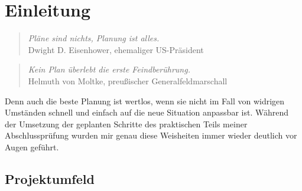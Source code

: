\section{Einleitung}
\label{sec:Einleitung}
\begin{center}
\begin{quote}
\textit{Pläne sind nichts, Planung ist alles.}\\
Dwight D. Eisenhower, ehemaliger US-Präsident
\end{quote}
\begin{quote}
\textit{Kein Plan überlebt die erste Feindberührung.}\\
Helmuth von Moltke, preußischer Generalfeldmarschall
\end{quote}
\end{center}
Denn auch die beste Planung ist wertlos, wenn sie nicht im Fall von widrigen Umständen schnell und einfach auf die neue Situation anpassbar ist. Während der Umsetzung der geplanten Schritte des praktischen Teils meiner Abschlussprüfung wurden mir genau diese Weisheiten immer wieder deutlich vor Augen geführt.

\subsection{Projektumfeld} 
\label{sec:Projektumfeld}
